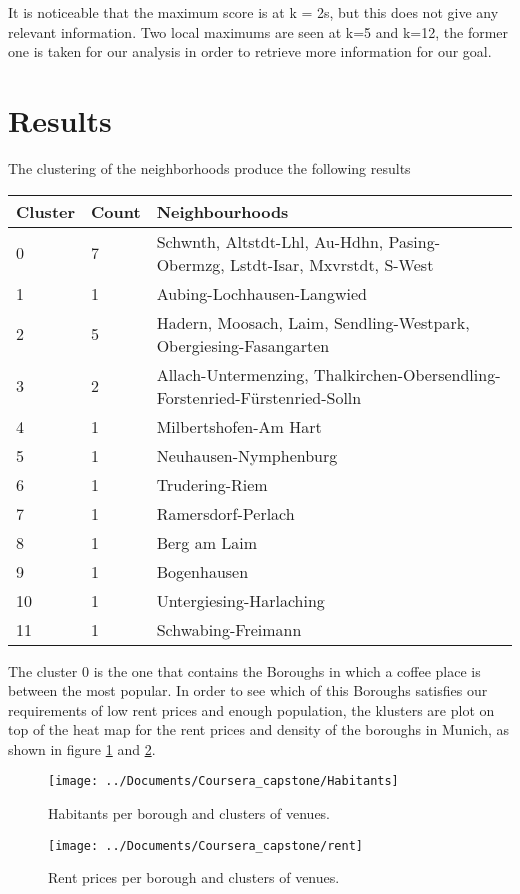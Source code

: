 \documentclass[]{report}
\begin{document}
It is noticeable that the maximum score is at k = 2s, but this does not give any relevant information. Two local maximums are seen at k=5 and k=12, the former one is taken for our analysis in order to retrieve more information for our goal. 

\section*{Results}

The clustering of the neighborhoods produce the following results


 \begin{center}
 	\begin{tabular}{ | l | l | l | }
 		\hline
 		
 		\textbf{Cluster} & \textbf{Count} & \textbf{Neighbourhoods} \\ \hline
 		0 & 7 & Schwnth, Altstdt-Lhl, Au-Hdhn, Pasing-Obermzg, Lstdt-Isar, Mxvrstdt, S-West\\ \hline
 		1 & 1 & Aubing-Lochhausen-Langwied\\ \hline
 		2 & 5 & Hadern, Moosach, Laim, Sendling-Westpark, Obergiesing-Fasangarten\\ \hline
 		3 & 2 & Allach-Untermenzing, Thalkirchen-Obersendling-Forstenried-Fürstenried-Solln\\ \hline
 		4 & 1 & Milbertshofen-Am Hart\\ \hline
 		5 & 1 & Neuhausen-Nymphenburg\\ \hline
 		6 & 1 & Trudering-Riem\\ \hline
 		7 & 1 & Ramersdorf-Perlach\\ \hline
 		8 & 1 & Berg am Laim\\ \hline
 		9 & 1 & Bogenhausen\\ \hline
 		10 & 1 & Untergiesing-Harlaching\\ \hline
 		11 & 1 & Schwabing-Freimann\\ \hline

 		\hline
 	\end{tabular}
 \end{center}

The cluster 0 is the one that contains the Boroughs in which a coffee place is between the most popular. In order to see which of this Boroughs satisfies our requirements of low rent prices and enough population, the klusters are plot on top of the heat map for the rent prices and density of the boroughs in Munich, as shown in figure \ref{fig:Density} and \ref{fig:rent}.
\begin{figure}
\centering
\texttt{[image: ../Documents/Coursera\_capstone/Habitants]}
\caption{Habitants per borough and clusters of venues.}
\label{fig:Density}
\end{figure}
\begin{figure}
\centering
\texttt{[image: ../Documents/Coursera\_capstone/rent]}
\caption{Rent prices per borough and clusters of venues.}
\label{fig:rent}
\end{figure}
\end{document}
